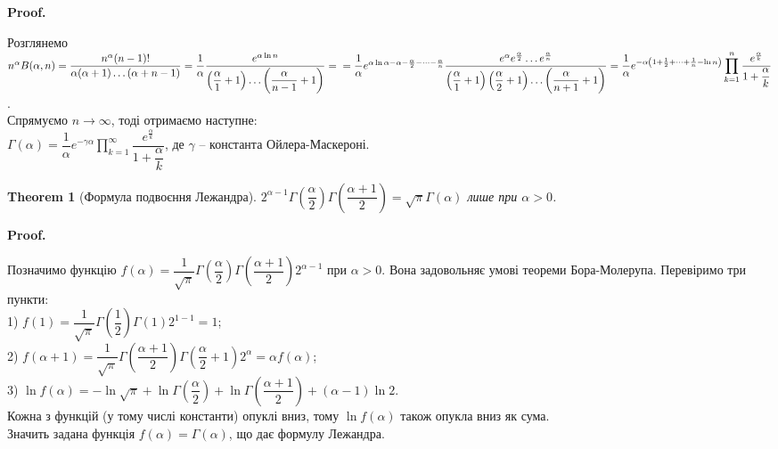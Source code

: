 \documentclass[a4paper, 10pt]{article}
\makeatletter
\def\qed{$\blacksquare$}
\theoremstyle{theoremdd}
\newtheorem{theorem}{Theorem}[subsection]
\theoremstyle{theoremdd}
\theoremstyle{theoremdd}
\theoremstyle{theoremdd}
\theoremstyle{theoremdd}
\theoremstyle{theoremdd}
\theoremstyle{theoremdd}
\theoremstyle{theoremdd}
\theoremstyle{theoremdd}
\renewenvironment{proof}[1][Proof.\\]{\par
\pushQED{\hfill \qed}%
\normalfont \topsep6\p@\@plus6\p@\relax
\trivlist
\item\relax
{\bfseries
#1\@addpunct{.}}\hspace\labelsep\ignorespaces
}{%
\popQED\endtrivlist\@endpefalse
}
\makeatother
\begin{document}
\begin{proof}
Розглянемо $n^\alpha B(\alpha,n) = \dfrac{n^\alpha(n-1)!}{\alpha (\alpha+1) \dots (\alpha+n-1)} = \dfrac{1}{\alpha} \dfrac{e^{\alpha \ln n}}{\left( \dfrac{\alpha}{1} + 1 \right) \dots \left( \dfrac{\alpha}{n-1} + 1 \right)} = \\
= \dfrac{1}{\alpha} e^{\alpha \ln \alpha - \alpha - \frac{\alpha}{2} - \dots - \frac{\alpha}{n}} \dfrac{e^\alpha e^{\frac{\alpha}{2}} \dots e^{\frac{\alpha}{n}}}{\left( \dfrac{\alpha}{1} + 1 \right)\left( \dfrac{\alpha}{2} + 1 \right)\dots \left( \dfrac{\alpha}{n+1} + 1 \right)} = \dfrac{1}{\alpha} e^{-\alpha \left( 1 + \frac{1}{2} + \dots + \frac{1}{n} - \ln n \right)} \displaystyle\prod_{k=1}^n \dfrac{e^{\frac{\alpha}{k}}}{1+\dfrac{\alpha}{k}}$.\\
Спрямуємо $n \to \infty$, тоді отримаємо наступне:\\
$\Gamma(\alpha) = \dfrac{1}{\alpha} e^{-\gamma \alpha} \displaystyle\prod_{k=1}^\infty \dfrac{e^{\frac{\alpha}{k}}}{1+\dfrac{\alpha}{k}}$, де $\gamma$ -- константа Ойлера-Маскероні.
\end{proof}

\begin{theorem}[Формула подвоєння Лежандра]
$2^{\alpha-1} \Gamma\left( \dfrac{\alpha}{2} \right) \Gamma\left( \dfrac{\alpha+1}{2} \right) = \sqrt{\pi} \Gamma(\alpha)$ лише при $\alpha >0$.
\end{theorem}

\begin{proof}
Позначимо функцію $f(\alpha) = \dfrac{1}{\sqrt{\pi}} \Gamma\left( \dfrac{\alpha}{2} \right) \Gamma\left( \dfrac{\alpha+1}{2} \right) 2^{\alpha-1}$ при $\alpha > 0$. Вона задовольняє умові теореми Бора-Молерупа. Перевіримо три пункти:\\
1) $f(1) = \dfrac{1}{\sqrt{\pi}} \Gamma\left( \dfrac{1}{2}\right) \Gamma(1) 2^{1-1} = 1$;\\
2) $f(\alpha+1) = \dfrac{1}{\sqrt{\pi}} \Gamma\left( \dfrac{\alpha+1}{2} \right) \Gamma\left( \dfrac{\alpha}{2}+1 \right)2^\alpha = \alpha f(\alpha)$;\\
3) $\ln f(\alpha) = -\ln \sqrt{\pi} + \ln \Gamma\left( \dfrac{\alpha}{2} \right) + \ln \Gamma\left( \dfrac{\alpha+1}{2} \right) + (\alpha-1)\ln 2$. \\
Кожна з функцій (у тому числі константи) опуклі вниз, тому $\ln f(\alpha)$ також опукла вниз як сума.\\
Значить задана функція $f(\alpha) = \Gamma(\alpha)$, що дає формулу Лежандра.
\end{proof}
\end{document}
